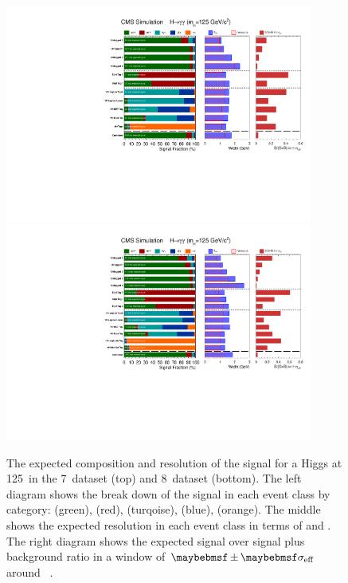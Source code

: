 \begin{figure}
  \begin{center}
    \includegraphics[width=0.9\textwidth]{analysis/plots/thesis_signal_7TeV/signalComposition.pdf} \\
    \includegraphics[width=0.9\textwidth]{analysis/plots/thesis_signal_8TeV/signalComposition.pdf}
    \caption{The expected composition and resolution of the signal for a \SM Higgs at 125~\GeV in the 7~\TeV dataset (top) and 8~\TeV dataset (bottom). The left diagram shows the break down of the signal in each event class by category: \ggH (green), \VBF (red), \WH (turqoise), \ZH (blue), \ttH (orange). The middle shows the expected resolution in each event class in terms of \sigeff and \sigFW. The right diagram shows the expected signal over signal plus background ratio in a window of $\pm\sigeff$ around ~\GeV.}
    \label{fig:signal_composition}
  \end{center}
\end{figure}
  
